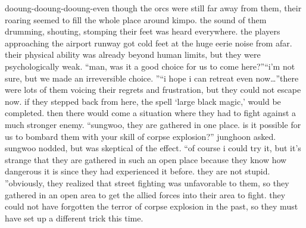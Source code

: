 dooung-dooung-dooung-even though the orcs were still far away from them, their roaring seemed to fill the whole place around kimpo.
the sound of them drumming, shouting, stomping their feet was heard everywhere.
the players approaching the airport runway got cold feet at the huge eerie noise from afar.
their physical ability was already beyond human limits, but they were psychologically weak.
“man, was it a good choice for us to come here?”“i’m not sure, but we made an irreversible choice.
”“i hope i can retreat even now…”there were lots of them voicing their regrets and frustration, but they could not escape now.
if they stepped back from here, the spell ‘large black magic,’ would be completed.
 then there would come a situation where they had to fight against a much stronger enemy.
“sungwoo, they are gathered in one place.
 is it possible for us to bombard them with your skill of corpse explosion?” junghoon asked.
sungwoo nodded, but was skeptical of the effect.
“of course i could try it, but it’s strange that they are gathered in such an open place because they know how dangerous it is since they had experienced it before.
 they are not stupid.
”obviously, they realized that street fighting was unfavorable to them, so they gathered in an open area to get the allied forces into their area to fight.
 they could not have forgotten the terror of corpse explosion in the past, so they must have set up a different trick this time.


 